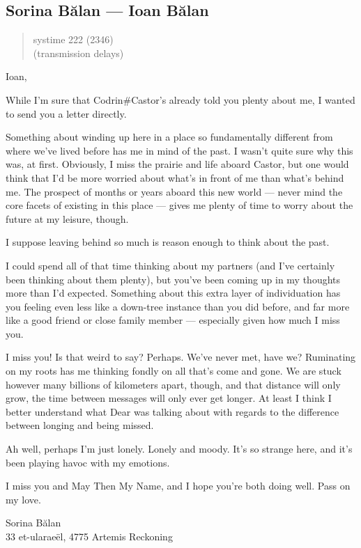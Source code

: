 \hypertarget{sorina-bux103lan-ioan-bux103lan}{%
\subsection{Sorina Bălan — Ioan Bălan}\label{sorina-bux103lan-ioan-bux103lan}}

\begin{quote}
systime 222 (2346)\\
(transmission delays)
\end{quote}

Ioan,

While I'm sure that Codrin\#Castor's already told you plenty about me, I wanted to send you a letter directly.

Something about winding up here in a place so fundamentally different from where we've lived before has me in mind of the past. I wasn't quite sure why this was, at first. Obviously, I miss the prairie and life aboard Castor, but one would think that I'd be more worried about what's in front of me than what's behind me. The prospect of months or years aboard this new world — never mind the core facets of existing in this place — gives me plenty of time to worry about the future at my leisure, though.

I suppose leaving behind so much is reason enough to think about the past.

I could spend all of that time thinking about my partners (and I've certainly been thinking about them plenty), but you've been coming up in my thoughts more than I'd expected. Something about this extra layer of individuation has you feeling even less like a down-tree instance than you did before, and far more like a good friend or close family member — especially given how much I miss you.

I miss you! Is that weird to say? Perhaps. We've never met, have we? Ruminating on my roots has me thinking fondly on all that's come and gone. We are stuck however many billions of kilometers apart, though, and that distance will only grow, the time between messages will only ever get longer. At least I think I better understand what Dear was talking about with regards to the difference between longing and being missed.

Ah well, perhaps I'm just lonely. Lonely and moody. It's so strange here, and it's been playing havoc with my emotions.

I miss you and May Then My Name, and I hope you're both doing well. Pass on my love.

Sorina Bălan\\
33 et-ularaeël, 4775 Artemis Reckoning
